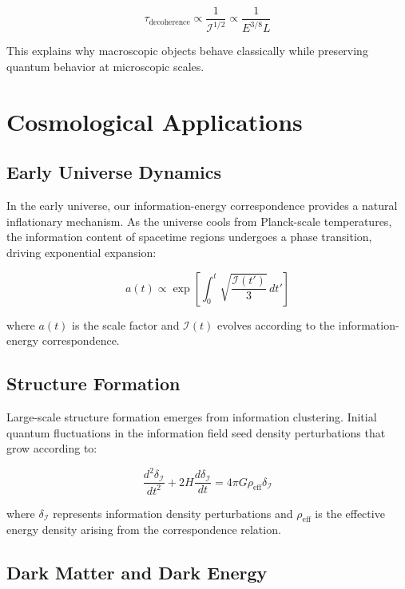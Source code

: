 \documentclass[11pt,a4paper]{article}
\begin{document}
\begin{equation}
\tau_{\text{decoherence}} \propto \frac{1}{\mathcal{I}^{1/2}} \propto \frac{1}{E^{3/8} L}
\end{equation}

This explains why macroscopic objects behave classically while preserving quantum behavior at microscopic scales.

\section{Cosmological Applications}

\subsection{Early Universe Dynamics}

In the early universe, our information-energy correspondence provides a natural inflationary mechanism. As the universe cools from Planck-scale temperatures, the information content of spacetime regions undergoes a phase transition, driving exponential expansion:

\begin{equation}
a(t) \propto \exp\left[\int_0^t \sqrt{\frac{\mathcal{I}(t')}{3}} \, dt'\right]
\end{equation}

where $a(t)$ is the scale factor and $\mathcal{I}(t)$ evolves according to the information-energy correspondence.

\subsection{Structure Formation}

Large-scale structure formation emerges from information clustering. Initial quantum fluctuations in the information field seed density perturbations that grow according to:

\begin{equation}
\frac{d^2\delta_{\mathcal{I}}}{dt^2} + 2H\frac{d\delta_{\mathcal{I}}}{dt} = 4\pi G \rho_{\text{eff}} \delta_{\mathcal{I}}
\end{equation}

where $\delta_{\mathcal{I}}$ represents information density perturbations and $\rho_{\text{eff}}$ is the effective energy density arising from the correspondence relation.

\subsection{Dark Matter and Dark Energy}
\end{document}
